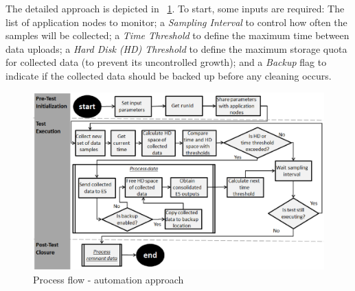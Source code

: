 \documentclass[runningheads,a4paper]{llncs}
\begin{document}
The detailed approach is depicted in \figurename
~\ref{fig_ApproachDiagram}. To start, some inputs  are required: The list of
application nodes to monitor; a \emph{Sampling Interval} to control how often
the samples will be collected; a \emph{Time Threshold} to define the maximum time between
data uploads; a \emph{Hard Disk (HD) Threshold} to define the maximum storage
quota for collected data (to prevent its uncontrolled growth); and a
\emph{Backup} flag to indicate if the collected data should be backed up before
any cleaning occurs.


\begin{figure}[!h]
\centering
\includegraphics[totalheight=.34\textheight,width=1.0\textwidth]{ApproachDiagram}
\caption{Process flow - automation approach}
\label{fig_ApproachDiagram}
\end{figure}

\end{document}
